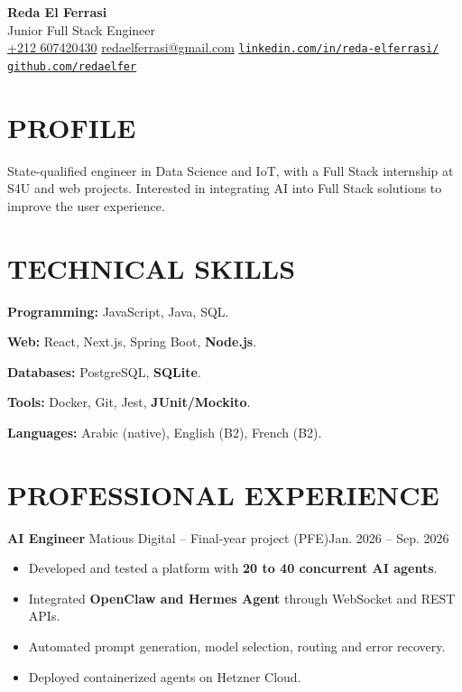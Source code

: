 \documentclass[11pt,a4paper]{article}
\newcommand{\entry}[2]{\noindent #1\hfill #2\par}
\begin{document}
\begin{center}
  {\LARGE\bfseries Reda El Ferrasi}\\[3pt]
  {\large Junior Full Stack Engineer}\\[5pt]
  {\small
    \href{tel:+212607420430}{+212 607420430}
    \enspace\textbar{}\enspace
    \href{mailto:redaelferrasi@gmail.com}{redaelferrasi@gmail.com}
    \enspace\textbar{}\enspace
    \href{https://www.linkedin.com/in/reda-elferrasi/}{\nolinkurl{linkedin.com/in/reda-elferrasi/}}
    \enspace\textbar{}\enspace
    \href{https://github.com/redaelfer}{\nolinkurl{github.com/redaelfer}}
  }
\end{center}
\vspace{-5pt}


\section*{PROFILE}
State-qualified engineer in Data Science and IoT, with a Full Stack internship at S4U and web projects. Interested in integrating AI into Full Stack solutions to improve the user experience.

\section*{TECHNICAL SKILLS}
\textbf{Programming:} JavaScript, Java, SQL.\par
\textbf{Web:} React, Next.js, Spring Boot, \textbf{Node.js}.\par
\textbf{Databases:} PostgreSQL, \textbf{SQLite}.\par
\textbf{Tools:} Docker, Git, Jest, \textbf{JUnit/Mockito}.\par
\textbf{Languages:} Arabic (native), English (B2), French (B2).

\section*{PROFESSIONAL EXPERIENCE}

\entry{\textbf{AI Engineer} \textbar{} Matious Digital -- Final-year project (PFE)}{Jan. 2026 -- Sep. 2026}
\begin{itemize}
  \item Developed and tested a platform with \textbf{20 to 40 concurrent AI agents}.
  \item Integrated \textbf{OpenClaw and Hermes Agent} through WebSocket and REST APIs.
  \item Automated prompt generation, model selection, routing and error recovery.
  \item Deployed containerized agents on Hetzner Cloud.
\end{itemize}
\end{document}
